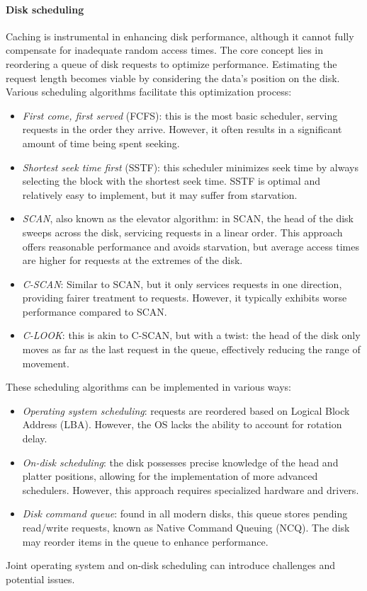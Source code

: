 \paragraph*{Disk scheduling}
Caching is instrumental in enhancing disk performance, although it cannot fully compensate for inadequate random access times. 
The core concept lies in reordering a queue of disk requests to optimize performance. 
Estimating the request length becomes viable by considering the data's position on the disk.
Various scheduling algorithms facilitate this optimization process:
\begin{itemize}
    \item \textit{First come, first served} (FCFS): this is the most basic scheduler, serving requests in the order they arrive. 
        However, it often results in a significant amount of time being spent seeking.
    \item \textit{Shortest seek time first} (SSTF): this scheduler minimizes seek time by always selecting the block with the shortest seek time. 
        SSTF is optimal and relatively easy to implement, but it may suffer from starvation.
    \item \textit{SCAN}, also known as the elevator algorithm: in SCAN, the head of the disk sweeps across the disk, servicing requests in a linear order. 
        This approach offers reasonable performance and avoids starvation, but average access times are higher for requests at the extremes of the disk.
    \item \textit{C-SCAN}: Similar to SCAN, but it only services requests in one direction, providing fairer treatment to requests. 
        However, it typically exhibits worse performance compared to SCAN.
    \item \textit{C-LOOK}: this is akin to C-SCAN, but with a twist: the head of the disk only moves as far as the last request in the queue, effectively reducing the range of movement.
\end{itemize}
These scheduling algorithms can be implemented in various ways:
\begin{itemize}
    \item \textit{Operating system scheduling}: requests are reordered based on Logical Block Address (LBA). 
        However, the OS lacks the ability to account for rotation delay.
    \item \textit{On-disk scheduling}: the disk possesses precise knowledge of the head and platter positions, allowing for the implementation of more advanced schedulers. 
        However, this approach requires specialized hardware and drivers.
    \item \textit{Disk command queue}: found in all modern disks, this queue stores pending read/write requests, known as Native Command Queuing (NCQ). 
        The disk may reorder items in the queue to enhance performance.
\end{itemize}
Joint operating system and on-disk scheduling can introduce challenges and potential issues.

